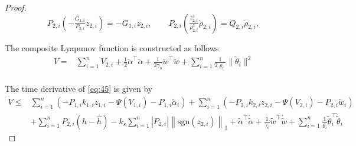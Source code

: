\documentclass[pdflatex,sn-mathphys-num]{sn-jnl}%
\theoremstyle{thmstyleone}%
\theoremstyle{thmstyletwo}%
\theoremstyle{thmstylethree}%
\begin{document}
\begin{proof}
\[
P_{2,i}\!\left(-\tfrac{G_{1,i}}{P_{2,i}}z_{2,i}\right)=-G_{1,i}z_{2,i},\qquad
P_{2,i}\!\left(\tfrac{z_{2,i}^3}{\rho_{2,i}^3}\dot\rho_{2,i}\right)=Q _{2,i}\dot\rho_{2,i},
\]


The composite Lyapunov function is constructed as follows
\begin{equation}\label{eq:45}
	\begin{aligned}
		V= &\sum_{i=1}^n V_{2,i}+\tfrac{1}{2}\tilde\alpha^\top \tilde\alpha+\tfrac{1}{2\gamma_o}\tilde w^\top\tilde w+\sum_{i=1}^n\tfrac{1}{2\varrho_i}\|\tilde\theta_i\|^2\\
	\end{aligned}
\end{equation}

The time derivative of \cref{eq:45} is given by
\begin{equation}\label{eq:45}
	\begin{aligned}
		\dot{V} \le&\sum_{i=1}^n \left( -P_{1,i} k_{1,i}z_{1,i}-\Psi(V_{1,i})-P_{1,i}\tilde\alpha_i\right)
+\sum_{i=1}^n \left( -P_{2,i} k_{2,i}z_{2,i}-\Psi(V_{2,i})-P_{2,i}\tilde{w}_i  \right)\\
&+\sum_{i=1}^n P_{2,i}(h-\hat{h})-k_s\sum_{i=1}^n |P_{2,i}|\left\lVert  \mathrm{sgn}(z_{2,i})  \right\rVert_1+\tilde\alpha^\top \dot{\tilde \alpha}+\tfrac{1}{\gamma_o}\tilde w^\top \dot{\tilde w}+\sum_{i=1}^n\tfrac{1}{\varrho_i}\tilde \theta_i^\top \dot{\tilde \theta}_i 
	\end{aligned}
\end{equation}




\end{proof}
\end{document}
